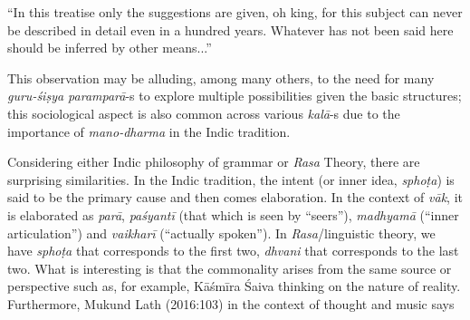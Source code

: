 \begin{myquote}
“In this treatise only the suggestions are given, oh king, for this subject can never be described in detail even in a hundred years. Whatever has not been said here should be inferred by other means...” 
\end{myquote}

This observation may be alluding, among many others, to the need for many \textsl{guru-śiṣya paramparā}-s to explore multiple possibilities given the basic structures; this sociological aspect is also common across various \textsl{kalā}-s due to the importance of \textsl{mano-dharma} in the Indic tradition. 

\newpage

Considering either Indic philosophy of grammar or \textsl{Rasa} Theory, there are surprising similarities. In the Indic tradition, the intent (or inner idea, \textsl{sphoṭa}) is said to be the primary cause and then comes elaboration. In the context of \textsl{vāk}, it is elaborated as \textsl{parā}, \textsl{paśyantī} (that which is seen by “seers”), \textsl{madhyamā} (“inner articulation”) and \textsl{vaikharī} (“actually spoken”). In \textsl{Rasa}/linguistic theory, we have \textsl{sphoṭa} that corresponds to the first two, \textsl{dhvani} that corresponds to the last two. What is interesting is that the commonality arises from the same source or perspective such as, for example, Kāśmīra Śaiva thinking on the nature of reality. Furthermore, Mukund Lath (2016:103) in the context of thought and music says 

